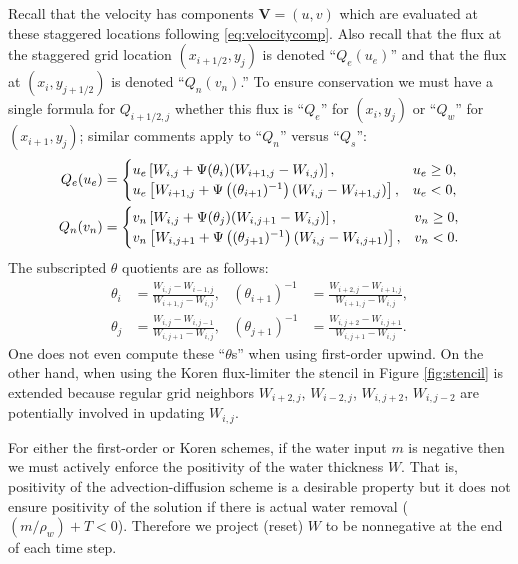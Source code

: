 \documentclass[11pt,final]{amsart}
\newcommand\bV{\mathbf{V}}
\begin{document}
Recall that the velocity has components $\bV=(u,v)$ which are evaluated at these staggered locations following \eqref{eq:velocitycomp}.  Also recall that the flux at the staggered grid location $(x_{i+1/2},y_j)$ is denoted ``$Q_e(u_e)$'' and that the flux at $(x_i,y_{j+1/2})$ is denoted ``$Q_n(v_n)$.''  To ensure conservation we must have a single formula for $Q_{i+1/2,j}$ whether this flux is ``$Q_e$'' for $(x_i,y_j)$ or ``$Q_w$'' for $(x_{i+1},y_j)$; similar comments apply to ``$Q_n$'' versus ``$Q_s$'':
\begin{align}
Q_e(u_e) &= \begin{cases} u_e \left[W_{i,j} + \Psi(\theta_{i}) (W_{i+1,j} - W_{i,j})\right], & u_e \ge 0, \\ u_e \left[W_{i+1,j} + \Psi\left((\theta_{i+1})^{-1}\right) (W_{i,j} - W_{i+1,j})\right], & u_e < 0, \end{cases} \label{eq:adfluxes} \\
Q_n(v_n) &= \begin{cases} v_n \left[W_{i,j} + \Psi(\theta_{j}) (W_{i,j+1} - W_{i,j})\right], & v_n \ge 0, \\ v_n \left[W_{i,j+1} + \Psi\left((\theta_{j+1})^{-1}\right) (W_{i,j} - W_{i,j+1})\right], & v_n < 0. \end{cases} \notag
\end{align}
The subscripted $\theta$ quotients are as follows:
\begin{align*}
\theta_i &= \frac{W_{i,j}-W_{i-1,j}}{W_{i+1,j} - W_{i,j}}, & (\theta_{i+1})^{-1} &= \frac{W_{i+2,j}-W_{i+1,j}}{W_{i+1,j} - W_{i,j}}, \\
\theta_j &= \frac{W_{i,j}-W_{i,j-1}}{W_{i,j+1} - W_{i,j}}, & (\theta_{j+1})^{-1} &= \frac{W_{i,j+2}-W_{i,j+1}}{W_{i,j+1} - W_{i,j}}.
\end{align*}
One does not even compute these ``$\theta$s'' when using first-order upwind.  On the other hand, when using the Koren flux-limiter the stencil in Figure \ref{fig:stencil} is extended because regular grid neighbors $W_{i+2,j}$, $W_{i-2,j}$, $W_{i,j+2}$, $W_{i,j-2}$ are potentially involved in updating $W_{i,j}$.

For either the first-order or Koren schemes, if the water input $m$ is negative then we must actively enforce the positivity of the water thickness $W$.  That is, positivity of the advection-diffusion scheme is a desirable property but it does not ensure positivity of the solution if there is actual water removal ($(m/\rho_w) + T < 0$).  Therefore we project (reset) $W$ to be nonnegative at the end of each time step.
\end{document}
